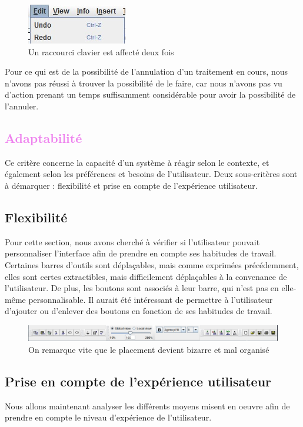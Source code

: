 \documentclass[12pt, a4paper]{article}
\begin{document}
\begin{figure}[h]
\begin{center}
   \includegraphics[scale = 0.8]{ctrlz.jpg}
	\caption{Un raccourci clavier est affecté deux fois}
	\end{center}
\end{figure}

Pour ce qui est de la possibilité de l'annulation d'un traitement en cours, nous n'avons pas réussi à trouver la possibilité de le faire, car nous n'avons pas vu d'action prenant un temps suffisamment considérable pour avoir la possibilité de l'annuler.

\textcolor{Violet}{\section{Adaptabilité}}
Ce critère concerne la capacité d'un système à réagir selon le contexte, et également selon les préférences et besoins de l'utilisateur. Deux sous-critères sont à démarquer : flexibilité et prise en compte de l'expérience utilisateur. 

\textcolor{NavyBlue}{\subsection{Flexibilité}}
Pour cette section, nous avons cherché à vérifier si l'utilisateur pouvait personnaliser l'interface afin de prendre en compte ses habitudes de travail. \\


Certaines barres d'outils sont déplaçables, mais comme exprimées précédemment, elles sont certes extractibles, mais difficilement déplaçables à la convenance de l'utilisateur. De plus, les boutons sont associés à leur barre, qui n'est pas en elle-même personnalisable. Il aurait été intéressant de permettre à l'utilisateur d'ajouter ou d'enlever des boutons en fonction de ses habitudes de travail.
\begin{figure}[h]
\begin{center}
   \includegraphics[scale = 0.5]{bazzare.jpg}
	\caption{On remarque vite que le placement devient bizarre et mal organisé}
	\end{center}
\end{figure}
\newpage
\textcolor{NavyBlue}{\subsection{Prise en compte de l'expérience utilisateur}}
Nous allons maintenant analyser les différents moyens misent en oeuvre afin de prendre en compte le niveau d'expérience de l'utilisateur.\\
\end{document}
